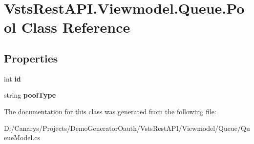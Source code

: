 \hypertarget{class_vsts_rest_a_p_i_1_1_viewmodel_1_1_queue_1_1_pool}{}\section{Vsts\+Rest\+A\+P\+I.\+Viewmodel.\+Queue.\+Pool Class Reference}
\label{class_vsts_rest_a_p_i_1_1_viewmodel_1_1_queue_1_1_pool}
\subsection*{Properties}
\begin{DoxyCompactItemize}
\item 
\mbox{\label{class_vsts_rest_a_p_i_1_1_viewmodel_1_1_queue_1_1_pool_ad75826bbfd4290efbbf23daaa0c8759b}} 
int {\bfseries id}
\item 
\mbox{\label{class_vsts_rest_a_p_i_1_1_viewmodel_1_1_queue_1_1_pool_ae1e50c35efe45110a7d6fad19fc2103b}} 
string {\bfseries pool\+Type}
\end{DoxyCompactItemize}


The documentation for this class was generated from the following file\+:\begin{DoxyCompactItemize}
\item 
D\+:/\+Canarys/\+Projects/\+Demo\+Generator\+Oauth/\+Vsts\+Rest\+A\+P\+I/\+Viewmodel/\+Queue/Queue\+Model.\+cs\end{DoxyCompactItemize}
